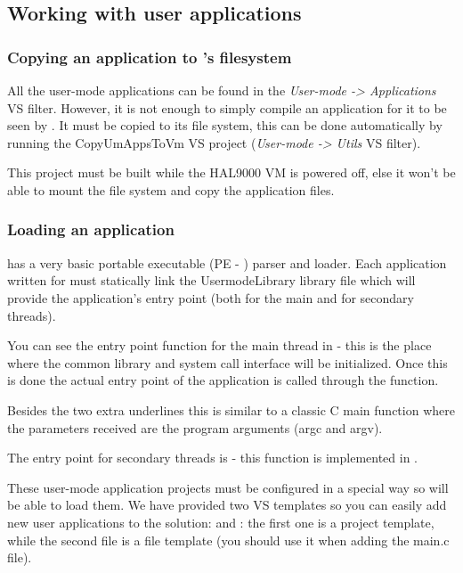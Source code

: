 \subsection{Working with user applications}

\subsubsection{Copying an application to \projectname's filesystem}

All the user-mode applications can be found in the \textit{User-mode -> Applications} VS filter.
However, it is not enough to simply compile an application for it to be seen by \projectname. It
must be copied to its file system, this can be done automatically by running the CopyUmAppsToVm
VS project (\textit{User-mode -> Utils} VS filter).

This project must be built while the HAL9000 VM is powered off, else it won't be able to mount the
file system and copy the application files.

\subsubsection{Loading an application}
\label{sect:AppLoad}

\projectname has a very basic portable executable (PE - \cite{msdnPE}) parser and loader. Each
application written for \projectname must statically link the UsermodeLibrary library file which 
will provide the application's entry point (both for the main and for secondary threads).

You can see the entry point function for the main thread  in  - this
is the place where the common library and system call interface will be initialized. Once this is
done the actual entry point of the application is called through the  function.

Besides the two extra underlines this is similar to a classic C main function where the parameters
received are the program arguments (argc and argv).

The entry point for secondary threads is  - this function is implemented in
.

These user-mode application projects must be configured in a special way so \projectname will be
able to load them. We have provided two VS templates so you can easily add new user applications to
the solution:  and : the first one is
a project template, while the second file is a file template (you should use it when adding the
main.c file).

